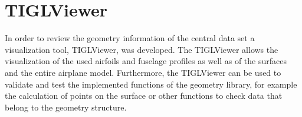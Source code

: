\section{TIGLViewer}
In order to review the geometry information of the central data set a visualization
tool, TIGLViewer, was developed. The TIGLViewer allows the visualization of the used airfoils and
fuselage profiles as well as of the surfaces and the entire airplane model.
Furthermore, the TIGLViewer can be used to validate and test the implemented
functions of the geometry library, for example the calculation of points on the
surface or other functions to check data that belong to the geometry structure.










